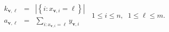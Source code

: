 \begin{displaymath}
	\begin{array}{lcl}
		k_{\mathbf{v},\ell} &=& |\left\lbrace i : x_{\mathbf{v},i}=\ell\right\rbrace|\\
		a_{\mathbf{v}, \ell} &=& \sum\limits_{i:x_{\mathbf{v},i}=\ell} y_{\mathbf{v},i}
	\end{array}\;\;1\leq i \leq n, \;\; 1\leq \ell \leq m.
\end{displaymath}
